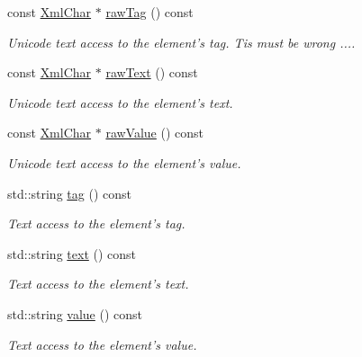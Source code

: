 \begin{DoxyCompactItemize}
const \hyperlink{namespace_d_d4hep_1_1_x_m_l_a09e5d9cc86ed782f6826dfe0778c1815}{XmlChar} $\ast$ \hyperlink{class_d_d4hep_1_1_x_m_l_1_1_handle__t_a8b0a2f06da75cd065a84dd0ebcb70b27}{rawTag} () const 
\begin{DoxyCompactList}\small\item\em Unicode text access to the element's tag. Tis must be wrong .... \item\end{DoxyCompactList}\item 
const \hyperlink{namespace_d_d4hep_1_1_x_m_l_a09e5d9cc86ed782f6826dfe0778c1815}{XmlChar} $\ast$ \hyperlink{class_d_d4hep_1_1_x_m_l_1_1_handle__t_abb57bc0eb49a7b0c2ebc6d9e34547c56}{rawText} () const 
\begin{DoxyCompactList}\small\item\em Unicode text access to the element's text. \item\end{DoxyCompactList}\item 
const \hyperlink{namespace_d_d4hep_1_1_x_m_l_a09e5d9cc86ed782f6826dfe0778c1815}{XmlChar} $\ast$ \hyperlink{class_d_d4hep_1_1_x_m_l_1_1_handle__t_a6dfd5ec05f926fd5aec1e5dd163f3577}{rawValue} () const 
\begin{DoxyCompactList}\small\item\em Unicode text access to the element's value. \item\end{DoxyCompactList}\item 
std::string \hyperlink{class_d_d4hep_1_1_x_m_l_1_1_handle__t_a8d7c8b63a04958e0a492afe0ac69c8b6}{tag} () const 
\begin{DoxyCompactList}\small\item\em Text access to the element's tag. \item\end{DoxyCompactList}\item 
std::string \hyperlink{class_d_d4hep_1_1_x_m_l_1_1_handle__t_a3db3aa16d50df894c2942f2ddf7efa48}{text} () const 
\begin{DoxyCompactList}\small\item\em Text access to the element's text. \item\end{DoxyCompactList}\item 
std::string \hyperlink{class_d_d4hep_1_1_x_m_l_1_1_handle__t_a6561b8a5429179b0d2c5d7f02e5cf3be}{value} () const 
\begin{DoxyCompactList}\small\item\em Text access to the element's value. \item\end{DoxyCompactList}\item 

\end{DoxyCompactItemize}
